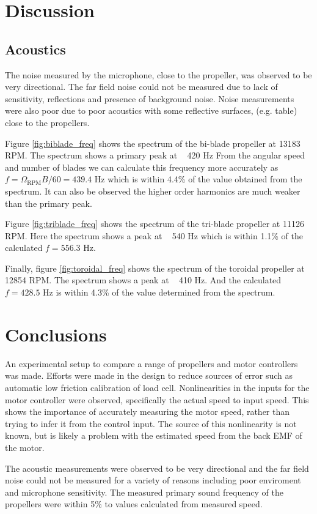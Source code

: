 \documentclass[8pt]{article}
\begin{document}
\section{Discussion}

\subsection{Acoustics}

The noise measured by the microphone, close to the propeller, was observed to be very directional.
The far field noise could not be measured due to lack of sensitivity, reflections and presence of background noise.
Noise measurements were also poor due to poor acoustics with some reflective surfaces, (e.g. table) close to the propellers.

Figure \ref{fig:biblade_freq} shows the spectrum of the bi-blade propeller at 13183 RPM.
The spectrum shows a primary peak at ~ 420 Hz
From the angular speed and number of blades we can calculate this frequency more accurately as 
$ f = \Omega_\text{RPM} B / 60 = 439.4$ Hz which is within 4.4\% of the value obtained from the spectrum.
It can also be observed the higher order harmonics are much weaker than the primary peak.

Figure \ref{fig:triblade_freq} shows the spectrum of the tri-blade propeller at 11126 RPM.
Here the spectrum shows a peak at ~ 540 Hz which is within 1.1\% of the calculated $f = 556.3$ Hz.

Finally, figure \ref{fig:toroidal_freq} shows the spectrum of the toroidal propeller at 12854 RPM.
The spectrum shows a peak at ~ 410 Hz. And the calculated $f = 428.5$ Hz is within 4.3\% of the value determined from the spectrum.

\section{Conclusions}

An experimental setup to compare a range of propellers and motor controllers was made. Efforts were made in the design to reduce sources of error such as automatic low friction calibration of load cell.
Nonlinearities in the inputs for the motor controller were observed, specifically the actual speed to input speed.
This shows the importance of accurately measuring the motor speed, rather than trying to infer it from the control input.
The source of this nonlinearity is not known, but is likely a problem with the estimated speed from the back EMF of the motor.

The acoustic measurements were observed to be very directional and the far field noise could not be measured for a variety of reasons including poor enviroment and microphone sensitivity.
The measured primary sound frequency of the propellers were within 5\% to values calculated from measured speed.
\end{document}
